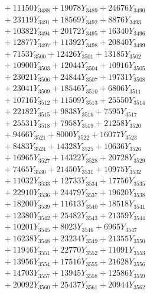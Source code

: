\documentclass[a4paper,10pt]{article}
\begin{document}
{\begin{align}
&\;  + 11150 Y_{3488} + 19078 Y_{3489} + 24676 Y_{3490} \\[0.3ex]
&\;  + 23119 Y_{3491} + 18569 Y_{3492} + 8876 Y_{3493} \\[0.3ex]
&\;  + 10382 Y_{3494} + 20172 Y_{3495} + 16340 Y_{3496} \\[0.3ex]
&\;  + 12877 Y_{3497} + 11392 Y_{3498} + 20840 Y_{3499} \\[0.3ex]
&\;  + 7153 Y_{3500} + 12426 Y_{3501} + 13185 Y_{3502} \\[0.3ex]
&\;  + 10900 Y_{3503} + 12044 Y_{3504} + 10916 Y_{3505} \\[0.3ex]
&\;  + 23021 Y_{3506} + 24844 Y_{3507} + 19731 Y_{3508} \\[0.5ex]\allowbreak
&\;  + 23041 Y_{3509} + 18546 Y_{3510} + 6806 Y_{3511} \\[0.3ex]
&\;  + 10716 Y_{3512} + 11509 Y_{3513} + 25550 Y_{3514} \\[0.3ex]
&\;  + 22182 Y_{3515} + 9838 Y_{3516} + 7595 Y_{3517} \\[0.3ex]
&\;  + 25531 Y_{3518} + 7958 Y_{3519} + 21258 Y_{3520} \\[0.3ex]
&\;  + 9466 Y_{3521} + 8000 Y_{3522} + 16077 Y_{3523} \\[0.3ex]
&\;  + 8483 Y_{3524} + 14328 Y_{3525} + 10636 Y_{3526} \\[0.3ex]
&\;  + 16965 Y_{3527} + 14322 Y_{3528} + 20728 Y_{3529} \\[0.3ex]
&\;  + 7465 Y_{3530} + 21450 Y_{3531} + 10975 Y_{3532} \\[0.3ex]
&\;  + 11032 Y_{3533} + 12733 Y_{3534} + 17756 Y_{3535} \\[0.3ex]
&\;  + 22910 Y_{3536} + 24479 Y_{3537} + 19620 Y_{3538} \\[0.5ex]\allowbreak
&\;  + 18200 Y_{3539} + 11613 Y_{3540} + 18518 Y_{3541} \\[0.3ex]
&\;  + 12380 Y_{3542} + 25482 Y_{3543} + 21359 Y_{3544} \\[0.3ex]
&\;  + 10201 Y_{3545} + 8023 Y_{3546} + 6965 Y_{3547} \\[0.3ex]
&\;  + 16238 Y_{3548} + 23234 Y_{3549} + 21355 Y_{3550} \\[0.3ex]
&\;  + 11946 Y_{3551} + 22770 Y_{3552} + 11091 Y_{3553} \\[0.3ex]
&\;  + 13956 Y_{3554} + 17516 Y_{3555} + 21628 Y_{3556} \\[0.3ex]
&\;  + 14703 Y_{3557} + 13945 Y_{3558} + 12586 Y_{3559} \\[0.3ex]
&\;  + 20092 Y_{3560} + 25437 Y_{3561} + 20944 Y_{3562} \\[0.3ex]

\end{align}}
\end{document}
